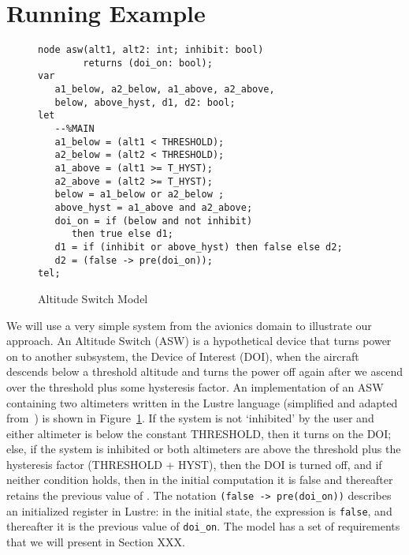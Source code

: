 \section{Running Example}
\label{sec:example}


\begin{figure}[t]
\centering
{\smaller
\begin{verbatim}
node asw(alt1, alt2: int; inhibit: bool)
        returns (doi_on: bool);
var
   a1_below, a2_below, a1_above, a2_above,
   below, above_hyst, d1, d2: bool;
let
   --%MAIN
   a1_below = (alt1 < THRESHOLD);
   a2_below = (alt2 < THRESHOLD);
   a1_above = (alt1 >= T_HYST);
   a2_above = (alt2 >= T_HYST);
   below = a1_below or a2_below ;
   above_hyst = a1_above and a2_above;
   doi_on = if (below and not inhibit) 
      then true else d1;
   d1 = if (inhibit or above_hyst) then false else d2;
   d2 = (false -> pre(doi_on));
tel;
\end{verbatim}
}
\vspace{-0.1in}
\caption{Altitude Switch Model}
\label{fig:asw}
\end{figure}

We will use a very simple system from the avionics domain to illustrate our approach. An Altitude Switch (ASW) is a hypothetical device that turns power on to another subsystem, the Device of Interest (DOI), when the aircraft descends below a threshold altitude and turns the power off again after we ascend over the threshold plus some hysteresis factor.  An implementation of an ASW containing two altimeters written in the Lustre language (simplified and adapted from~\cite{HCW02:ase-deviation}) is shown in Figure~\ref{fig:asw}.  If the system is not `inhibited' by the user and either altimeter is below the constant THRESHOLD, then it turns on the DOI; else, if the system is inhibited or both altimeters are above the threshold plus the hysteresis factor (THRESHOLD + HYST), then the DOI is turned off, and if neither condition holds, then in the initial computation it is false and thereafter retains the previous value of .  The notation \texttt{(false -> pre(doi\_on))} describes an initialized register in Lustre: in the initial state, the expression is \texttt{false}, and thereafter it is the previous value of \texttt{doi\_on}.  The model has a set of requirements that we will present in Section XXX.


